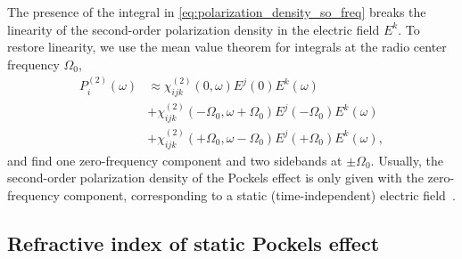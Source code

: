 The presence of the integral in \cref{eq:polarization_density_so_freq} breaks the linearity of the second-order polarization density in the electric field $E^k$.
To restore linearity, we use the mean value theorem for integrals at the radio center frequency $\Omega_0$,
\begin{equation}
	\begin{split}
		P_i^{(2)}(\omega)
		&\approx
		\chi^{(2)}_{ijk}(0,\omega)
		E^j(0)
		E^k(\omega)
		\\
		&+
		\chi^{(2)}_{ijk}(-\Omega_0,\omega+\Omega_0)
		E^j(-\Omega_0)
		E^k(\omega)
		\\
		&+
		\chi^{(2)}_{ijk}(+\Omega_0,\omega-\Omega_0)
		E^j(+\Omega_0)
		E^k(\omega)
		,
	\end{split}
\end{equation}
and find one zero-frequency component and two sidebands at $\pm\Omega_0$.
Usually, the second-order polarization density of the Pockels effect is only given with the zero-frequency component, corresponding to a static (time-independent) electric field~\cite[p.~495]{Boyd2020}.

\subsection{Refractive index of static Pockels effect}\label{sec:static_pockels}


